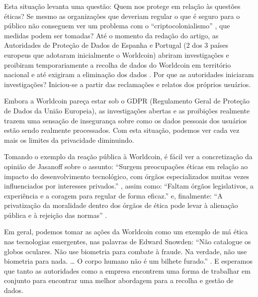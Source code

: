 \documentclass[referee,sn-basic]{sn-jnl}
\theoremstyle{thmstyleone}%
\begin{document}
Esta situação levanta uma questão: Quem nos protege em relação às questões éticas? Se mesmo as organizações que deveriam regular o que é seguro para o público não conseguem ver um problema com o “criptocolonialismo” \cite{GuoWorldcoin2022}, que medidas podem ser tomadas? Até o momento da redação do artigo, as Autoridades de Proteção de Dados de Espanha e Portugal (2 dos 3 países europeus que adotaram inicialmente o Worldcoin) abriram investigações e proibiram temporariamente a recolha de dados do Worldcoin em território nacional e até exigiram a eliminação dos dados \cite{Lomasworldcoin2023}. Por que as autoridades iniciaram investigações? Iniciou-se a partir das reclamações e relatos dos próprios usuários.\par

Embora a Worldcoin pareça estar sob o GDPR (Regulamento Geral de Proteção de Dados da União Europeia), as investigações abertas e as proibições realmente trazem uma sensação de insegurança sobre como os dados pessoais dos usuários estão sendo realmente processados. Com esta situação, podemos ver cada vez mais os limites da privacidade diminuindo.\par

Tomando o exemplo da reação pública à Worldcoin, é fácil ver a concretização da opinião de Jasanoff sobre o assunto: “Surgem preocupações éticas em relação ao impacto do desenvolvimento tecnológico, com órgãos especializados muitas vezes influenciados por interesses privados.” \cite{ethicsinvention}, assim como: “Faltam órgãos legislativos, a experiência e a coragem para regular de forma eficaz.” \cite{ethicsinvention} e, finalmente: “A privatização da moralidade dentro dos órgãos de ética pode levar à alienação pública e à rejeição das normas” \cite{ethicsinvention}.\par

Em geral, podemos tomar as ações da Worldcoin como um exemplo de má ética nas tecnologias emergentes, nas palavras de Edward Snowden: “Não catalogue os globos oculares. Não use biometria para combate à fraude. Na verdade, não use biometria para nada. … O corpo humano não é um bilhete furado.” \cite{roth2023worldcoin}. E esperamos que tanto as autoridades como a empresa encontrem uma forma de trabalhar em conjunto para encontrar uma melhor abordagem para a recolha e gestão de dados.
\end{document}
